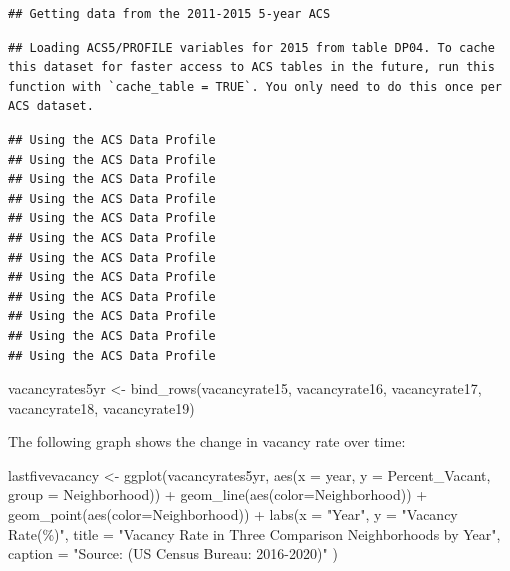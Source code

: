 \documentclass[
]{article}
\newenvironment{Shaded}{\begin{snugshade}}{\end{snugshade}}
\newcommand{\AttributeTok}[1]{\textcolor[rgb]{0.77,0.63,0.00}{#1}}
\newcommand{\FunctionTok}[1]{\textcolor[rgb]{0.00,0.00,0.00}{#1}}
\newcommand{\NormalTok}[1]{#1}
\newcommand{\OtherTok}[1]{\textcolor[rgb]{0.56,0.35,0.01}{#1}}
\newcommand{\SpecialCharTok}[1]{\textcolor[rgb]{0.00,0.00,0.00}{#1}}
\newcommand{\StringTok}[1]{\textcolor[rgb]{0.31,0.60,0.02}{#1}}
\begin{document}
\begin{verbatim}
## Getting data from the 2011-2015 5-year ACS
\end{verbatim}

\begin{verbatim}
## Loading ACS5/PROFILE variables for 2015 from table DP04. To cache this dataset for faster access to ACS tables in the future, run this function with `cache_table = TRUE`. You only need to do this once per ACS dataset.
\end{verbatim}

\begin{verbatim}
## Using the ACS Data Profile
## Using the ACS Data Profile
## Using the ACS Data Profile
## Using the ACS Data Profile
## Using the ACS Data Profile
## Using the ACS Data Profile
## Using the ACS Data Profile
## Using the ACS Data Profile
## Using the ACS Data Profile
## Using the ACS Data Profile
## Using the ACS Data Profile
## Using the ACS Data Profile
\end{verbatim}

\begin{Shaded}
\begin{Highlighting}[]
\NormalTok{vacancyrates5yr }\OtherTok{\textless{}{-}} \FunctionTok{bind\_rows}\NormalTok{(vacancyrate15, vacancyrate16, vacancyrate17, vacancyrate18, vacancyrate19)}
\end{Highlighting}
\end{Shaded}

The following graph shows the change in vacancy rate over time:

\begin{Shaded}
\begin{Highlighting}[]
\NormalTok{lastfivevacancy }\OtherTok{\textless{}{-}} \FunctionTok{ggplot}\NormalTok{(vacancyrates5yr, }\FunctionTok{aes}\NormalTok{(}\AttributeTok{x =}\NormalTok{ year, }\AttributeTok{y =}\NormalTok{ Percent\_Vacant, }\AttributeTok{group =}\NormalTok{ Neighborhood)) }\SpecialCharTok{+} 
\FunctionTok{geom\_line}\NormalTok{(}\FunctionTok{aes}\NormalTok{(}\AttributeTok{color=}\NormalTok{Neighborhood)) }\SpecialCharTok{+}
\FunctionTok{geom\_point}\NormalTok{(}\FunctionTok{aes}\NormalTok{(}\AttributeTok{color=}\NormalTok{Neighborhood)) }\SpecialCharTok{+}
\FunctionTok{labs}\NormalTok{(}\AttributeTok{x =} \StringTok{"Year"}\NormalTok{, }\AttributeTok{y =} \StringTok{"Vacancy Rate(\%)"}\NormalTok{,}
     \AttributeTok{title =} \StringTok{"Vacancy Rate in Three Comparison Neighborhoods by Year"}\NormalTok{,}
     \AttributeTok{caption =} \StringTok{"Source: (US Census Bureau: 2016{-}2020)"}\NormalTok{ )}
\end{Highlighting}
\end{Shaded}
\end{document}

